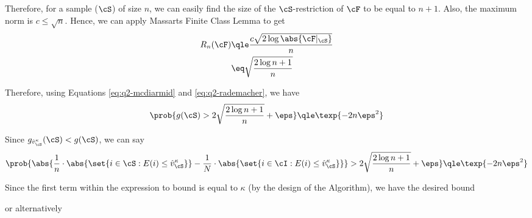 \documentclass[a4paper,10pt]{article}
\begin{document}
\begin{question}
	Therefore, for a sample ($\cS$) of size $n$, we can easily find the size of the $\cS$-restriction of $\cF$ to be equal to $n + 1$. Also, the maximum norm is $c \le \sqrt{n}$. Hence, we can apply Massarts Finite Class Lemma to get
	\begin{align*}
		R_n(\cF)	&\qle	\frac{c \sqrt{2 \log{\abs{\cF|_\cS}}}}{n} \\
		&\eq	\sqrt{\frac{2 \log{n + 1}}{n}}
	\end{align*}

	Therefore, using Equations \ref{eq:q2-mcdiarmid} and \ref{eq:q2-rademacher}, we have
	\begin{align*}
		\prob{g(\cS) > 2 \sqrt{\frac{2 \log{n + 1}}{n}} + \eps}	\qle	\texp{- 2 n \eps^2}
	\end{align*}

	Since $g_{\hat{v}_\cS^\kappa}(\cS) < g(\cS)$, we can say
	\begin{align*}
		\prob{\abs{\frac{1}{n} \cdot \abs{\set{i \in \cS : E(i) \le \hat{v}_{\cS}^\kappa}} - \frac{1}{N} \cdot \abs{\set{i \in \cI : E(i) \le \hat{v}_{\cS}^\kappa}}} > 2 \sqrt{\frac{2 \log{n + 1}}{n}} + \eps}	\qle	\texp{- 2 n \eps^2}
	\end{align*}

	Since the first term within the expression to bound is equal to $\kappa$ (by the design of the Algorithm), we have the desired bound
	\begin{tightcenter}
		or alternatively
	\end{tightcenter}

\end{question}
\end{document}
